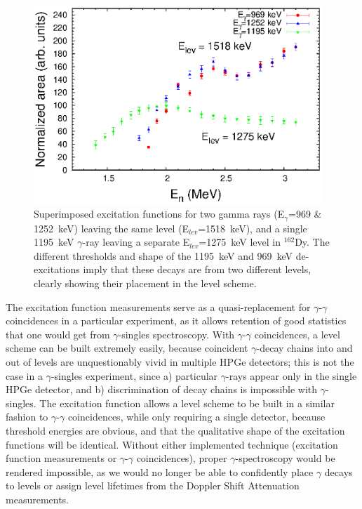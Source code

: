 \begin{figure}[h] 
\begin{center}
\includegraphics[width=0.97\textwidth]{matching_exf.eps}
\caption{Superimposed excitation functions for two gamma rays (E$_\gamma$=969 \& 1252~keV) leaving the same level (E$_{lev}$=1518~keV), and a single 1195~keV $\gamma$-ray leaving a separate E$_{lev}$=1275~keV level in $^{162}$Dy. The different thresholds and shape of the 1195~keV and 969~keV de-excitations imply that these decays are from two different levels, clearly showing their placement in the level scheme.}
\label{fig:matching_exf}
\end{center}
\end{figure}

The excitation function measurements serve as a quasi-replacement for $\gamma$-$\gamma$ coincidences in a particular experiment, as it allows retention of good statistics that one would get from $\gamma$-singles spectroscopy. With $\gamma$-$\gamma$ coincidences, a level scheme can be built extremely easily, because coincident $\gamma$-decay chains into and out of levels are unquestionably vivid in multiple HPGe detectors; this is not the case in a $\gamma$-singles experiment, since a) particular $\gamma$-rays appear only in the single HPGe detector, and b) discrimination of decay chains is impossible with $\gamma$-singles. The excitation function allows a level scheme to be built in a similar fashion to $\gamma$-$\gamma$ coincidences, while only requiring a single detector, because threshold energies are obvious, and that the qualitative shape of the excitation functions will be identical. Without either implemented technique (excitation function measurements or $\gamma$-$\gamma$ coincidences), proper $\gamma$-spectroscopy would be rendered impossible, as we would no longer be able to confidently place $\gamma$ decays to levels or assign level lifetimes from the Doppler Shift Attenuation measurements.
